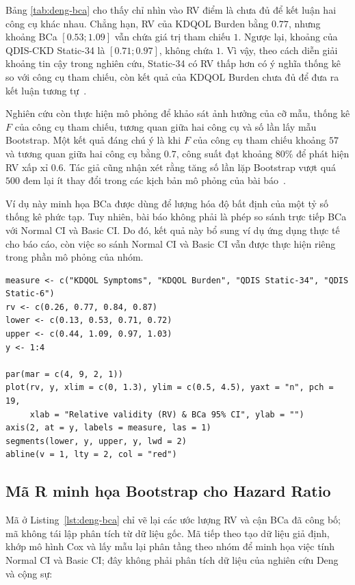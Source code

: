 \documentclass[12pt,a4paper]{article}
\theoremstyle{definition}
\numberwithin{equation}{section}
\begin{document}
Bảng \ref{tab:deng-bca} cho thấy chỉ nhìn vào RV điểm là chưa đủ để
kết luận hai công cụ khác nhau. Chẳng hạn, RV của KDQOL Burden bằng
$0.77$, nhưng khoảng BCa $[0.53;1.09]$ vẫn chứa giá trị tham chiếu $1$.
Ngược lại, khoảng của QDIS-CKD Static-34 là $[0.71;0.97]$, không chứa
$1$. Vì vậy, theo cách diễn giải khoảng tin cậy trong nghiên cứu,
Static-34 có RV thấp hơn có ý nghĩa thống kê so với công cụ tham chiếu,
còn kết quả của KDQOL Burden chưa đủ để đưa ra kết luận tương tự~\cite{deng2013}.

Nghiên cứu còn thực hiện mô phỏng để khảo sát ảnh hưởng của cỡ mẫu,
thống kê $F$ của công cụ tham chiếu, tương quan giữa hai công cụ và số
lần lấy mẫu Bootstrap. Một kết quả đáng chú ý là khi $F$ của công cụ
tham chiếu khoảng $57$ và tương quan giữa hai công cụ bằng $0.7$, công
suất đạt khoảng $80\%$ để phát hiện RV xấp xỉ $0.6$. Tác giả cũng nhận
xét rằng tăng số lần lặp Bootstrap vượt quá $500$ đem lại ít thay đổi
trong các kịch bản mô phỏng của bài báo~\cite{deng2013}.

Ví dụ này minh họa BCa được dùng để lượng hóa độ bất định của một tỷ số
thống kê phức tạp. Tuy nhiên, bài báo không phải là phép so sánh trực
tiếp BCa với Normal CI và Basic CI. Do đó, kết quả này bổ sung ví dụ ứng
dụng thực tế cho báo cáo, còn việc so sánh Normal CI và Basic CI vẫn
được thực hiện riêng trong phần mô phỏng của nhóm.

\begin{lstlisting}[style=Rstyle, caption={Vẽ lại các khoảng BCa được công bố trong bài báo}, label={lst:deng-bca}]
measure <- c("KDQOL Symptoms", "KDQOL Burden", "QDIS Static-34", "QDIS Static-6")
rv <- c(0.26, 0.77, 0.84, 0.87)
lower <- c(0.13, 0.53, 0.71, 0.72)
upper <- c(0.44, 1.09, 0.97, 1.03)
y <- 1:4

par(mar = c(4, 9, 2, 1))
plot(rv, y, xlim = c(0, 1.3), ylim = c(0.5, 4.5), yaxt = "n", pch = 19,
     xlab = "Relative validity (RV) & BCa 95% CI", ylab = "")
axis(2, at = y, labels = measure, las = 1)
segments(lower, y, upper, y, lwd = 2)
abline(v = 1, lty = 2, col = "red")
\end{lstlisting}

\subsection{Mã R minh họa Bootstrap cho Hazard Ratio}

Mã ở Listing~\ref{lst:deng-bca} chỉ vẽ lại các ước lượng RV và cận BCa đã công bố; mã không tái lập phân tích từ dữ liệu gốc. Mã tiếp theo tạo dữ liệu giả định, khớp mô hình Cox và lấy mẫu lại phân tầng theo nhóm để minh họa việc tính Normal CI và Basic CI; đây không phải phân tích dữ liệu của nghiên cứu Deng và cộng sự:
\end{document}
